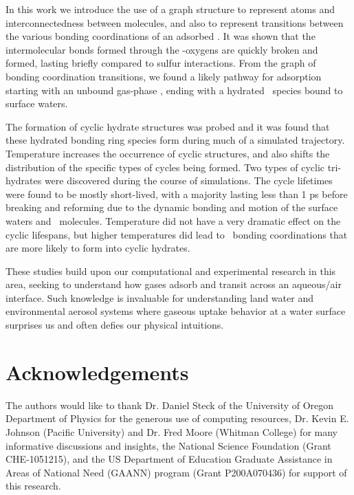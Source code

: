 \documentclass{article}
\begin{document}
In this work we introduce the use of a graph structure to represent atoms and interconnectedness between molecules, and also to represent transitions between the various bonding coordinations of an adsorbed \suldiox. It was shown that the intermolecular bonds formed through the \suldiox-oxygens are quickly broken and formed, lasting briefly compared to sulfur interactions. From the graph of bonding coordination transitions, we found a likely pathway for \suldiox adsorption starting with an unbound gas-phase \suldiox, ending with a hydrated \suldiox~species bound to surface waters.

The formation of cyclic hydrate structures was probed and it was found that these hydrated bonding ring species form during much of a simulated trajectory. Temperature increases the occurrence of cyclic structures, and also shifts the distribution of the specific types of cycles being formed. Two types of cyclic tri-hydrates were discovered during the course of simulations. The cycle lifetimes were found to be mostly short-lived, with a majority lasting less than 1 ps before breaking and reforming due to the dynamic bonding and motion of the surface waters and \suldiox~molecules. Temperature did not have a very dramatic effect on the cyclic lifespans, but higher temperatures did lead to \suldiox~bonding coordinations that are more likely to form into cyclic hydrates.

These studies build upon our computational and experimental research in this area, seeking to understand how gases adsorb and transit across an aqueous/air interface. Such knowledge is invaluable for understanding land water and environmental aerosol systems where gaseous uptake behavior at a water surface surprises us and often defies our physical intuitions.\cite{Jayne1990,Yang2002,Worsnop1989,Boniface2000}


\section {Acknowledgements}

The authors would like to thank Dr. Daniel Steck of the University of Oregon Department of Physics for the generous use of computing resources, Dr. Kevin E. Johnson (Pacific University) and Dr. Fred Moore (Whitman College) for many informative discussions and insights, the National Science Foundation (Grant CHE-1051215), and the US Department of Education Graduate Assistance in Areas of National Need (GAANN) program (Grant P200A070436) for support of this research.


\end{document}
